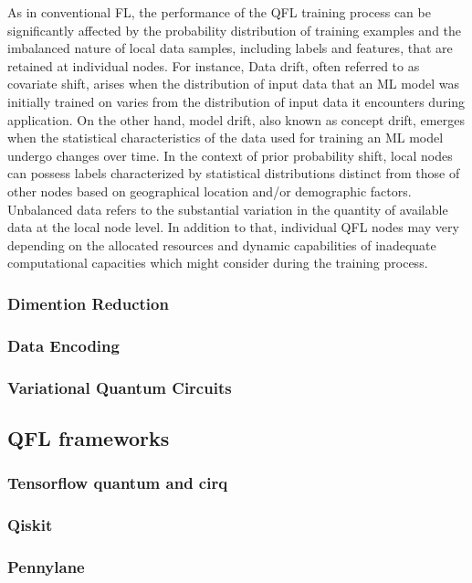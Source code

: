 As in conventional FL, the performance of the QFL training process can be significantly affected by the probability distribution of training examples and the imbalanced nature of local data samples, including labels and features, that are retained at individual nodes.
For instance, Data drift, often referred to as covariate shift, arises when the distribution of input data that an ML model was initially trained on varies from the distribution of input data it encounters during application.
On the other hand, model drift, also known as concept drift, emerges when the statistical characteristics of the data used for training an ML model undergo changes over time.
In the context of prior probability shift, local nodes can possess labels characterized by statistical distributions distinct from those of other nodes based on geographical location and/or demographic factors.
Unbalanced data refers to the substantial variation in the quantity of available data at the local node level.
In addition to that, individual QFL nodes may very depending on the allocated resources and dynamic capabilities of inadequate computational capacities which might consider during the training process.

\subsubsection{Dimention Reduction}
\subsubsection{Data Encoding}
\subsubsection{Variational Quantum Circuits}

\subsection{QFL frameworks}

\subsubsection{Tensorflow quantum and cirq}

\subsubsection{Qiskit}

\subsubsection{Pennylane}

